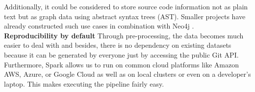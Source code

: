 Additionally, it could be considered to store source code information not as plain text but as graph data using abstract syntax trees (AST). Smaller projects have already constructed such use cases in combination with Neo4j \cite{miller2013graph, Arora2019}.\\
\textbf{Reproducibility by default} Through pre-processing, the data becomes much easier to deal with and besides, there is no dependency on existing datasets because it can be generated by everyone just by accessing the public Git API. Furthermore, Spark allows us to run on common cloud platforms like Amazon AWS, Azure, or Google Cloud as well as on local clusters or even on a developer's laptop. This makes executing the pipeline fairly easy. 